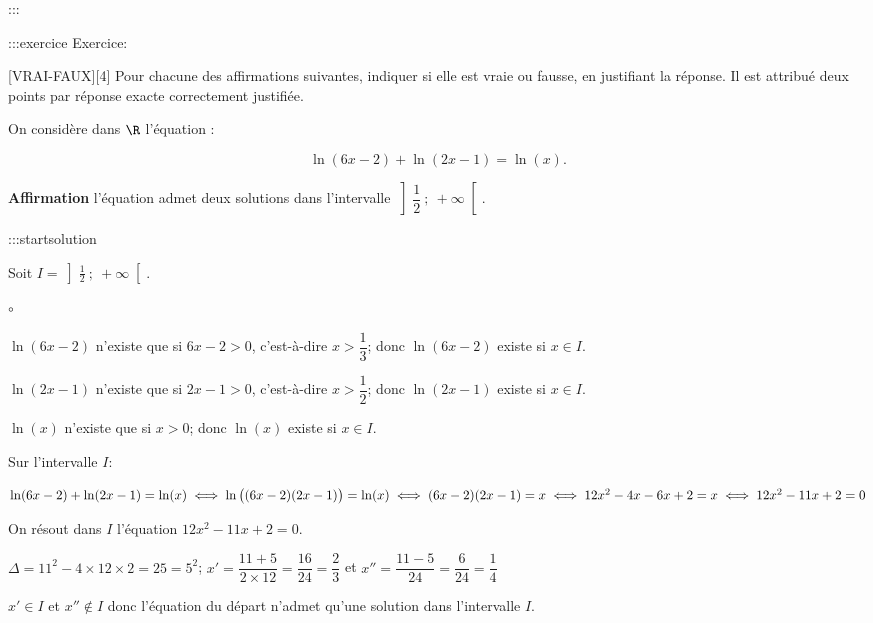 \documentclass{cornouaille}
\begin{document}
:::



:::exercice Exercice:

[VRAI-FAUX][4]
Pour chacune des  affirmations suivantes,
indiquer si elle est vraie ou fausse,
en justifiant la réponse.
Il est attribué deux points par réponse exacte correctement justifiée.



\begin{enumerate}

\item  On considère dans $\R$ l'équation :


$$
\ln (6 x - 2) + \ln (2x - 1) = \ln (x).
$$




\textbf{Affirmation} l'équation admet deux solutions dans l'intervalle $\left]\dfrac{1}{2}~;~+ \infty\right[$.


:::startsolution


\begin{list}{\textbullet}{}
\item Soit $I=\left]\frac{1}{2}~;~+ \infty\right[$.

\begin{list}{$\circ$}{}
\item $\ln\left (6x-2\right )$ n'existe que si $6x-2>0$, c'est-à-dire $x>\dfrac{1}{3}$; donc $\ln\left (6x-2\right )$ existe si $x\in I$.
\item $\ln\left (2x-1\right )$ n'existe que si $2x-1>0$, c'est-à-dire $x>\dfrac{1}{2}$; donc $\ln\left (2x-1\right )$ existe si $x\in I$.
\item $\ln\left (x\right )$ n'existe que si $x>0$; donc $\ln\left (x\right )$ existe si $x\in I$.
\end{list}

\item Sur l'intervalle $I$:

$\ln (6 x - 2) + \ln (2x - 1) = \ln (x)
\iff \ln \left ((6 x - 2)(2x - 1)\strut\right ) = \ln (x)
\iff  (6 x - 2)(2x - 1) = x \newline
\iff 12x^2 - 4x - 6x + 2 = x
\iff 12x^2 -11x +2=0$
\item On résout dans $I$ l'équation $12x^2 -11x +2=0$.

$\Delta = 11^2 - 4\times 12\times 2 = 25 = 5^2$;
$x'=\dfrac{11+5}{2\times 12} = \dfrac{16}{24}=\dfrac{2}{3}$ et
$x''=\dfrac{11-5}{24}=\dfrac{6}{24}= \dfrac{1}{4}$

$x'\in I$ et $x'' \not\in I$ donc l'équation du départ n'admet qu'une solution dans l'intervalle $I$.
\end{list}


\end{enumerate}
\end{document}
